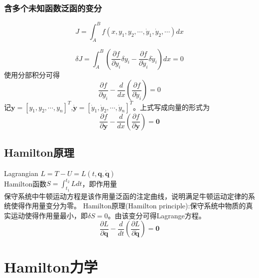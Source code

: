 \documentclass[12pt]{article}
\numberwithin{equation}{section}
\begin{document}
        \subsubsection{含多个未知函数泛函的变分}
        \begin{equation}
            J=\int_A^Bf(x,y_1,y_2,\cdots,\dot{y}_1,\dot{y}_2,\cdots)dx
        \end{equation}

        \begin{equation*}
            \delta J=\int_A^B\left(\frac{\partial f}{\partial y_i}\delta y_i-\frac{\partial f}{\partial \dot{y}_i}\delta \dot{y}_i\right)dx=0
        \end{equation*}
        使用分部积分可得
        \begin{equation}\label{mE-L}
            \frac{\partial f}{\partial y_i}-\frac{d}{dx}\left(\frac{\partial f}{\partial \dot{y}_i}\right)=0
        \end{equation}
        记$\mathbf{y}=[y_1,y_2,\cdots,y_n]^T$,$\dot{\mathbf{y}}=[\dot{y}_1,\dot{y}_2,\cdots,\dot{y}_n]^T$。上式写成向量的形式为
        \begin{equation}\label{vE-L}
            \frac{\partial f}{\partial \mathbf{y}}-\frac{d}{dx}\left(\frac{\partial f}{\partial \dot{\mathbf{y}}}\right)=\mathbf{0}
        \end{equation}

        \subsection{Hamilton原理}

        \noindent Lagrangian $L=T-U=L(t,\mathbf{q},\dot{\mathbf{q}})$\\
        Hamilton函数$S=\int_{t_1}^{t_2}Ldt$，即作用量\\
        保守系统中牛顿运动方程是该作用量泛函的注定曲线，说明满足牛顿运动定律的系统使得作用量变分为零。
        Hamilton原理(Hamilton principle):保守系统中物质的真实运动使得作用量最小，即$\delta S=0$。由该变分可得Lagrange方程。
        \begin{equation}\label{vLagrange}
            \frac{\partial L}{\partial \mathbf{q}}-\frac{d}{dt}\left(\frac{\partial L}{\partial \dot{\mathbf{q}}}\right)=\mathbf{0}
        \end{equation}

        \section{Hamilton力学}
\end{document}
